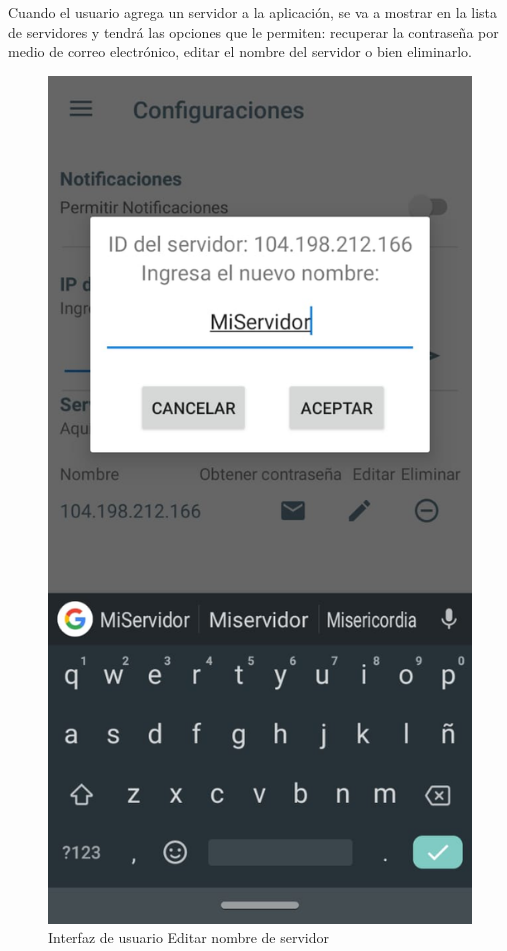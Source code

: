 Cuando el usuario agrega un servidor a la aplicación, se va a mostrar en la lista de servidores y tendrá las opciones que le permiten: recuperar la contraseña por medio de correo electrónico, editar el nombre del servidor o bien eliminarlo.

\begin{figure}[H]
	\centering
	\includegraphics[scale=0.4]{Capitulo4/software/submodulos/images/man12.png}
	\caption{Interfaz de usuario Editar nombre de servidor}
	\label{fig:Editar servidor}
\end{figure}

